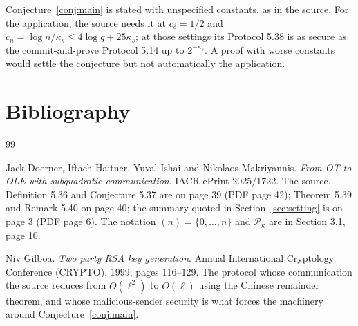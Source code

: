 \documentclass{conjura-conjecture}
\newcommand{\Prm}{\mathcal{P}}
\begin{document}
\begin{remark}
Conjecture~\ref{conj:main} is stated with unspecified constants, as in
the source. For the application, the source needs it at $c_{\delta} =
1/2$ and $c_{n} = \log n / \kappa_{s} \le 4 \log q + 25 \kappa_{s}$; at
those settings its Protocol 5.38 is as secure as the commit-and-prove
Protocol 5.14 up to $2^{-\kappa_{s}}$. A proof with worse constants
would settle the conjecture but not automatically the application.
\end{remark}

\section{Bibliography}

\begin{conjurabibliography}{99}

Jack Doerner, Iftach Haitner, Yuval Ishai and Nikolaos Makriyannis.
\emph{From OT to OLE with subquadratic communication}.
IACR ePrint 2025/1722.
The source. Definition 5.36 and Conjecture 5.37 are on page 39 (PDF page
42); Theorem 5.39 and Remark 5.40 on page 40; the summary quoted in
Section~\ref{sec:setting} is on page 3 (PDF page 6). The notation $(n) =
\{0,\dots,n\}$ and $\Prm_{\kappa}$ are in Section 3.1, page 10.

Niv Gilboa.
\emph{Two party RSA key generation}.
Annual International Cryptology Conference (CRYPTO), 1999, pages
116--129.
The protocol whose communication the source reduces from $O(\ell^{2})$
to $\widetilde{O}(\ell)$ using the Chinese remainder theorem, and whose
malicious-sender security is what forces the machinery around
Conjecture~\ref{conj:main}.

\end{conjurabibliography}
\end{document}
